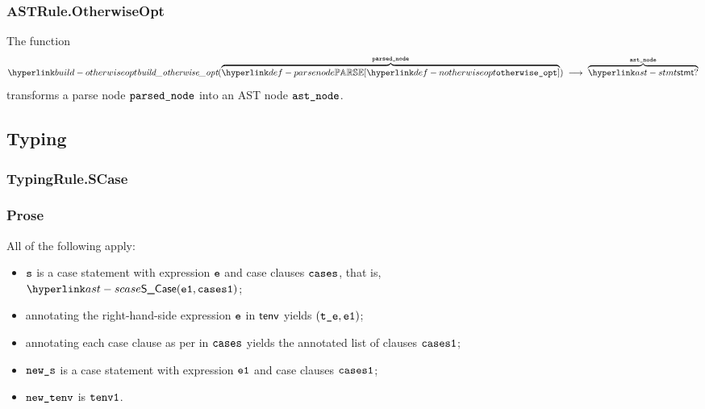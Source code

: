 \begin{mathpar}
\end{mathpar}

\subsubsection{ASTRule.OtherwiseOpt\label{sec:ASTRule.OtherwiseOpt}}
\hypertarget{build-otherwiseopt}{}
The function
\[
\buildotherwiseopt(\overname{\parsenode{\Notherwiseopt}}{\vparsednode}) \;\aslto\; \overname{\stmt?}{\vastnode}
\]
transforms a parse node $\vparsednode$ into an AST node $\vastnode$.

\begin{mathpar}
\end{mathpar}

\subsection{Typing}
\subsubsection{TypingRule.SCase \label{sec:TypingRule.SCase}}
\subsubsection{Prose}
All of the following apply:
\begin{itemize}
  \item $\vs$ is a case statement with expression $\ve$ and case clauses $\vcases$, that is, \\
        $\SCase(\veone, \vcasesone)$;
  \item annotating the right-hand-side expression $\ve$ in $\tenv$ yields $(\vte, \veone)$\ProseOrTypeError;
  \item annotating each case clause as per  in $\vcases$ yields the annotated list of clauses $\vcasesone$\ProseOrTypeError;
  \item $\news$ is a case statement with expression $\veone$ and case clauses $\vcasesone$;
  \item $\newtenv$ is $\tenvone$.
\end{itemize}
